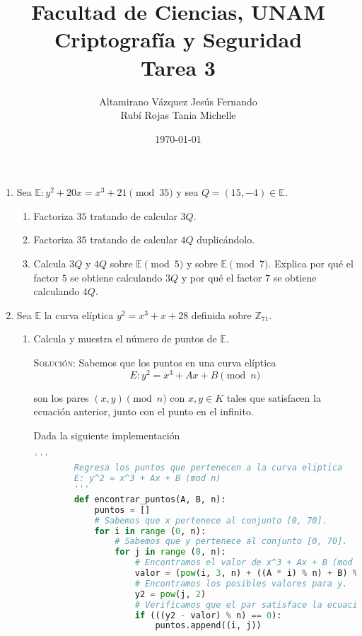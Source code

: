 \documentclass[letterpaper,11pt]{article}
\title{Facultad de Ciencias, UNAM \\ Criptografía y Seguridad \\ Tarea 3}
\author{Altamirano Vázquez Jesús Fernando \\
        Rubí Rojas Tania Michelle}
\date{\today}
\begin{document}
\maketitle

\begin{enumerate}
    \item Sea $\mathbb{E} : y^2 + 20x = x^3 + 21 \pmod{35}$ y sea $Q = (15, -4) 
    \in \mathbb{E}$.
    \begin{enumerate}
        \item Factoriza $35$ tratando de calcular $3Q$.
        \item Factoriza $35$ tratando de calcular $4Q$ duplicándolo.
        \item Calcula $3Q$ y $4Q$ sobre $\mathbb{E} \pmod{5}$ y sobre 
        $\mathbb{E} \pmod{7}$. Explica por qué el factor $5$ se obtiene 
        calculando $3Q$ y por qué el factor $7$ se obtiene calculando $4Q$. 
    \end{enumerate}

    \item Sea $\mathbb{E}$ la curva elíptica $y^2 = x^3 + x + 28$ definida sobre 
    $\mathbb{Z}_{71}$. 
    \begin{enumerate}
        \item Calcula y muestra el número de puntos de $\mathbb{E}$.
        
        \textsc{Solución:} Sabemos que los puntos en una curva elíptica 
        \begin{equation*}
            E : y^2 = x^3 + Ax + B \pmod{n}
        \end{equation*}
        
        son los pares $(x, y) \pmod{n}$ con $x, y \in K$ tales que satisfacen
        la ecuación anterior, junto con el punto en el infinito. 
        
        Dada la siguiente implementación
        \begin{lstlisting}[language = Python]
        '''
        Regresa los puntos que pertenecen a la curva eliptica 
        E: y^2 = x^3 + Ax + B (mod n)
        '''
        def encontrar_puntos(A, B, n):
            puntos = []
            # Sabemos que x pertenece al conjunto [0, 70].
            for i in range (0, n):
                # Sabemos que y pertenece al conjunto [0, 70]. 
                for j in range (0, n):
                    # Encontramos el valor de x^3 + Ax + B (mod n)
                    valor = (pow(i, 3, n) + ((A * i) % n) + B) % n
                    # Encontramos los posibles valores para y.
                    y2 = pow(j, 2)
                    # Verificamos que el par satisface la ecuacion.
                    if (((y2 - valor) % n) == 0):
                        puntos.append((i, j))
            

\end{lstlisting}
\end{enumerate}
\end{enumerate}
\end{document}
